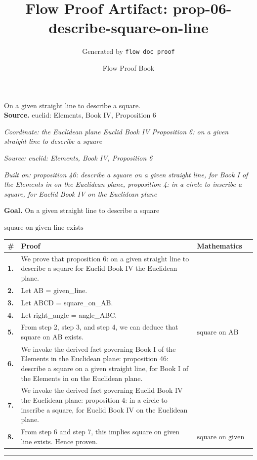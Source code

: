 \documentclass[11pt]{article}
\title{Flow Proof Artifact: prop-06-describe-square-on-line}
\author{Generated by \texttt{flow doc proof}}
\date{Flow Proof Book}
\theoremstyle{definition}
\begin{document}
\maketitle
On a given straight line to describe a square.\\[0.5em]
\textbf{Source.} euclid: Elements, Book IV, Proposition 6\\[0.5em]
\bigskip
{}\par
\smallskip\noindent\textit{Coordinate: the Euclidean plane \cdot Euclid Book IV \cdot Proposition 6: on a given straight line to describe a square}\par
\smallskip\noindent\textit{Source: euclid: Elements, Book IV, Proposition 6}\par
\smallskip\noindent\textit{Built on: proposition 46: describe a square on a given straight line, for Book I of the Elements in on the Euclidean plane, proposition 4: in a circle to inscribe a square, for Euclid Book IV on the Euclidean plane}\par
\medskip
\noindent\textbf{Goal.} On a given straight line to describe a square\par
\noindent$\displaystyle \text{square on given line exists}$\par
\medskip
\noindent
\begin{tabular}{@{} >{\raggedright\arraybackslash}p{} >{\raggedright\arraybackslash}p{} >{\raggedleft\arraybackslash}p{} @{}}
\textbf{\#} & \textbf{Proof} & \textbf{Mathematics} \\
\midrule
\textbf{1.} & We prove that proposition 6: on a given straight line to describe a square for Euclid Book IV the Euclidean plane. & \\[0.45em]
\textbf{2.} & Let AB = given\_line. & \\[0.45em]
\textbf{3.} & Let ABCD = square\_on\_AB. & \\[0.45em]
\textbf{4.} & Let right\_angle = angle\_ABC. & \\[0.45em]
\textbf{5.} & From step 2, step 3, and step 4, we can deduce that square on AB exists. & $\displaystyle \text{square on AB exists}$ \\[0.45em]
\textbf{6.} & We invoke the derived fact governing Book I of the Elements in the Euclidean plane: proposition 46: describe a square on a given straight line, for Book I of the Elements in on the Euclidean plane. & \\[0.45em]
\textbf{7.} & We invoke the derived fact governing Euclid Book IV the Euclidean plane: proposition 4: in a circle to inscribe a square, for Euclid Book IV on the Euclidean plane. & \\[0.45em]
\textbf{8.} & From step 6 and step 7, this implies square on given line exists. Hence proven. & $\displaystyle \text{square on given line exists}$ \\[0.45em]
\bottomrule
\end{tabular}
\label{thm:Geometry-Euclid Book IV-proposition_6_on_a_given_straight_line_to_describe_a_square}
\par\medskip\hrule
\end{document}
